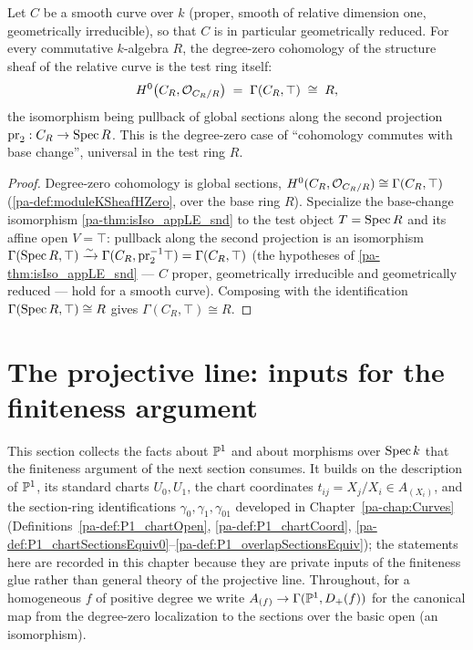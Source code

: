 \begin{theorem}
  \label{pa-thm:relStructureSectionsTop}
  \leanok

  Let \(C\) be a smooth curve over \(k\) (proper, smooth of relative dimension one, geometrically
  irreducible), so that \(C\) is in particular geometrically reduced. For every commutative
  \(k\)-algebra \(R\), the degree-zero cohomology of the structure sheaf of the relative curve is
  the test ring itself:
  \[
    H^0\bigl(C_R, \mathcal{O}_{C_R/R}\bigr) \;=\; \Gamma(C_R, \top) \;\cong\; R,
  \]
  the isomorphism being pullback of global sections along the second projection
  \(\mathrm{pr}_2 : C_R \to \operatorname{Spec} R\). This is the degree-zero case of ``cohomology commutes with
  base change'', universal in the test ring \(R\).
\end{theorem}
\begin{proof}
  \leanok
  Degree-zero cohomology is global sections, \(H^0(C_R, \mathcal{O}_{C_R/R}) \cong \Gamma(C_R, \top)\)
  (\ref{pa-def:moduleKSheafHZero}, over the base ring \(R\)). Specialize the base-change isomorphism
  \ref{pa-thm:isIso_appLE_snd} to the test object \(T = \operatorname{Spec} R\) and its affine open \(V = \top\):
  pullback along the second projection is an isomorphism
  \(\Gamma(\operatorname{Spec} R, \top) \xrightarrow{\sim} \Gamma(C_R, \mathrm{pr}_2^{-1}\top) = \Gamma(C_R, \top)\)
  (the hypotheses of \ref{pa-thm:isIso_appLE_snd} --- \(C\) proper, geometrically irreducible and
  geometrically reduced --- hold for a smooth curve). Composing with the identification
  \(\Gamma(\operatorname{Spec} R, \top) \cong R\) gives \(\Gamma(C_R, \top) \cong R\).
\end{proof}

\section{The projective line: inputs for the finiteness argument}

This section collects the facts about \(\mathbb{P}^1\) and about morphisms over \(\operatorname{Spec} k\) that
the finiteness argument of the next section consumes. It builds on the description of
\(\mathbb{P}^1\), its standard charts \(U_0, U_1\), the chart coordinates
\(t_{ij} = X_j/X_i \in A_{(X_i)}\), and the section-ring identifications
\(\gamma_0, \gamma_1, \gamma_{01}\) developed in Chapter~\ref{pa-chap:Curves}
(Definitions~\ref{pa-def:P1_chartOpen}, \ref{pa-def:P1_chartCoord},
\ref{pa-def:P1_chartSectionsEquiv0}--\ref{pa-def:P1_overlapSectionsEquiv}); the statements here
are recorded in this chapter because they are private inputs of the finiteness glue rather
than general theory of the projective line. Throughout, for a homogeneous \(f\) of positive
degree we write \(A_{(f)} \to \Gamma(\mathbb{P}^1, D_+(f))\) for the canonical map from the
degree-zero localization to the sections over the basic open (an isomorphism).

